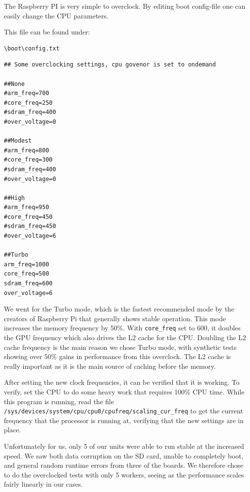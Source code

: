 The Raspberry PI is very simple to overclock. By editing boot config-file one can easily change the CPU parameters.

This file can be found under:

\begin{lstlisting}
\boot\config.txt
\end{lstlisting}

\begin{lstlisting}
## Some overclocking settings, cpu govenor is set to ondemand

##None
#arm_freq=700
#core_freq=250
#sdram_freq=400
#over_voltage=0

##Modest
#arm_freq=800
#core_freq=300
#sdram_freq=400
#over_voltage=0

##High
#arm_freq=950
#core_freq=450
#sdram_freq=450
#over_voltage=6

##Turbo
arm_freq=1000
core_freq=500
sdram_freq=600
over_voltage=6
\end{lstlisting}

We went for the Turbo mode, which is the fastest recommended mode by the creators of Raspberry Pi that generally shows stable operation.
This mode increases the memory frequency by 50\%.  With {\tt core\_freq} set to 600, it doubles the GPU frequency which also drives the L2 cache for the CPU.
Doubling the L2 cache frequency is the main reason we chose Turbo mode, with synthetic tests showing over 50\% gains in performance\cite{overclock} from this overclock.
The L2 cache is really important as it is the main source of caching before the memory.

After setting the new clock frequencies, it can be verified that it is working. To verify, set the CPU to do some heavy work that requires 100\% CPU time.
While this program is running, read the file {\tt /sys/devices/system/cpu/cpu0/cpufreq/scaling\_cur\_freq} to get the current frequency that the processor is running at, verifying that the new settings are in place.

Unfortunately for us, only 5 of our units were able to run stable at the increased speed.
We saw both data corruption on the SD card, unable to completely boot, and general random runtime errors from three of the boards.
We therefore chose to do the overclocked tests with only 5 workers, seeing as the performance scales fairly linearly in our cases.
